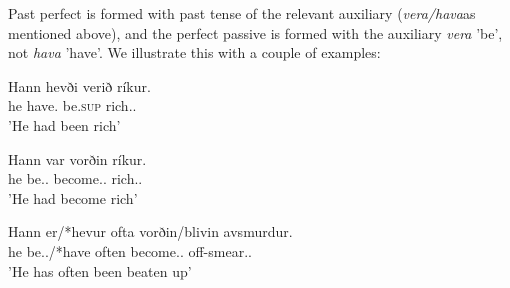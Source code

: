 \documentclass[12pt,%
    times,
]{lin-v2/lin}
\begin{document}
Past perfect is formed with past tense of the relevant auxiliary (\emph{vera/hava}as mentioned above), and the perfect
passive is formed with the auxiliary \emph{vera} 'be', not \emph{hava} 'have'. We illustrate this with a couple of examples:
\begin{exe}
    \ex
    \begin{xlist}
        \item \gll Hann hevði verið ríkur.\\
        he have.\Pst{} be.\textsc{sup} rich.\Nom.\M{}\\
        \trans 'He had been rich'
        \item \gll Hann var vorðin ríkur.\\
        he be.\Third\Sg.\Pst{} become.\Pst.\Ptcp{} rich.\Nom.\M{}\\
        \trans 'He had become rich'
    \end{xlist}
    \ex
    \gll Hann er/*hevur ofta vorðin/blivin avsmurdur.\\
    he be.\Third\Sg.\Prs{}/*have often become.\Pst.\Ptcp{} off-smear.\Nom.\M{}\\
    \trans 'He has often been beaten up'
\end{exe}
\end{document}
